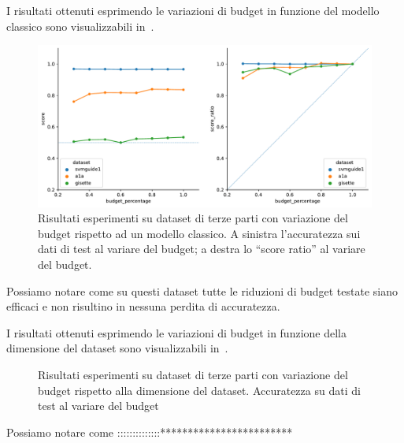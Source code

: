 I risultati ottenuti esprimendo le variazioni di budget in funzione del modello classico sono visualizzabili in~.
\begin{figure}
    \centering
    \includegraphics[width=1\linewidth]{img//TP/tp_old_strategy.pdf}
    \caption{Risultati esperimenti su dataset di terze parti con variazione del budget rispetto ad un modello classico. A sinistra l'accuratezza sui dati di test al variare del budget; a destra lo ``score ratio'' al variare del budget.}
    \label{fig:TP_old_strategy}
\end{figure}
Possiamo notare come su questi dataset tutte le riduzioni di budget testate siano efficaci e non risultino in nessuna perdita di accuratezza.

I risultati ottenuti esprimendo le variazioni di budget in funzione della dimensione del dataset sono visualizzabili in~.
\begin{figure}
    \centering
    \caption{Risultati esperimenti su dataset di terze parti con variazione del budget rispetto alla dimensione del dataset. Accuratezza su dati di test al variare del budget}
    \label{fig:TP_new_strategy}
\end{figure}
Possiamo notare come ::::::::::::::************************

